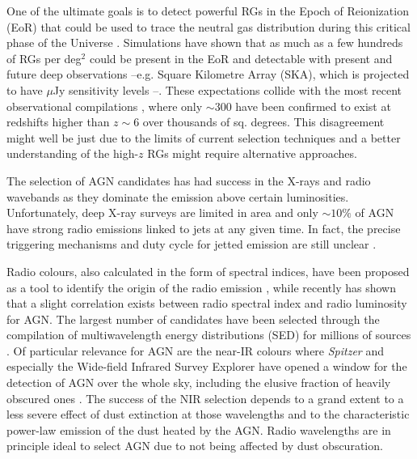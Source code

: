 \documentclass{aa}
\begin{document}
One of the ultimate goals is to detect powerful RGs in the Epoch of Reionization (EoR) that could be used to trace the neutral gas distribution during this critical phase of the Universe \citep[e.g.][]{2004NewAR..48.1029C, 2013MNRAS.435..460J}.
Simulations  have shown that as much as a few hundreds of RGs per deg$^2$ could be present in the EoR \citep[][]{2019MNRAS.485.2694A, 2019MNRAS.482....2B, 2021MNRAS.503.3492T} and detectable with present and future deep observations --e.g. Square Kilometre Array (SKA), which is projected to have $\mu$Jy sensitivity levels \citep{2015aska.confE..67P}--.
These expectations collide with the most recent observational compilations \citep[e.g.][]{2020ARA&A..58...27I, 2020MNRAS.494..789R}, where only ${\sim}300$ have been confirmed to exist at redshifts higher than $z{\sim}6$ over thousands of sq. degrees. This disagreement might well be just due to the limits of current selection techniques and a better understanding of the high-$z$ RGs might require alternative approaches.

The selection of AGN candidates has had success in the X-rays and radio wavebands as they dominate the emission above certain luminosities. Unfortunately, deep X-ray surveys are limited in area and only ${\sim}10\%$ of AGN have strong radio emissions linked to jets \citep[e.g.][]{1993MNRAS.263..461P, 2019NatAs...3...48S, 2021MNRAS.506.5888M} at any given time. In fact, the precise triggering mechanisms and duty cycle for jetted emission are still unclear \citep{2015aska.confE..71A, 2022MNRAS.510.1163P}.

Radio colours, also calculated in the form of spectral indices, have been proposed as a tool to identify the origin of the radio emission \citep{2000A&A...354..423L}, while recently \citet{2019A&A...622A..17S} has shown that a  slight correlation exists between radio spectral index and radio luminosity for AGN.
The largest number of candidates have been selected through the compilation of multiwavelength energy distributions (SED) for millions of sources \citep{2018ARA&A..56..625H, 2020PhDT.........3P}.  Of particular relevance for AGN are the near-IR colours where \textit{Spitzer} \citep{2004ApJS..154....1W} and especially  the Wide-field Infrared Survey Explorer \citep[\textit{WISE};][]{2010AJ....140.1868W} have opened a window for the detection of AGN over the whole sky, including the elusive fraction of heavily obscured ones \citep[e.g.][]{2012ApJ...753...30S, 2012MNRAS.426.3271M, 2017ApJ...836..182J, 2018ApJS..234...23A, 2021ApJ...922..179B}. The success of the NIR selection depends to a grand extent to a less severe effect of dust extinction at those wavelengths and to the characteristic power-law emission of the dust heated by the AGN. Radio wavelengths are in principle ideal to select AGN due to not being affected by dust obscuration. 
\end{document}
